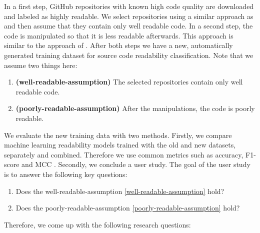 \documentclass[%
class=scrreprt,
chapterprefix=false,%
open=right,%
twoside=false,%
paper=a4,%
logofile={Logo\_zentral\_farbig\_EN.png},%
thesistype=masterproposal,%
UKenglish,%
]{se2thesis}
\begin{document}
	In a first step, GitHub repositories with known high code quality are downloaded and labeled as highly readable. We select repositories using a similar approach as \citeauthor{allamanis2016convolutional} \cite{allamanis2016convolutional} and then assume that they contain only well readable code.
	In a second step, the code is manipulated so that it is less readable afterwards. This approach is similar to the approach of \citeauthor{loriot2022styler} \cite{loriot2022styler}. After both steps we have a new, automatically generated training dataset for source code readability classification.
	Note that we assume two things here:
	\begin{enumerate}
		\item \label{well-readable-assumption} \textbf{(well-readable-assumption)} The selected repositories contain only well readable code.
		\item \label{poorly-readable-assumption} \textbf{(poorly-readable-assumption)} After the manipulations, the code is poorly readable.
	\end{enumerate}
	
	
	\label{compare-models} We evaluate the new training data with two methods. Firstly, we compare machine learning readability models trained with the old and new datasets, separately and combined. Therefore we use common metrics such as accuracy, F1-score and MCC \cite{chicco2020advantages}. 
	\label{user-study} Secondly, we conclude a user study. The goal of the user study is to answer the following key questions:
	
	
	\begin{enumerate}
		\item Does the well-readable-assumption \ref{well-readable-assumption} hold?
		\item Does the poorly-readable-assumption \ref{poorly-readable-assumption} hold?
	\end{enumerate}
	
	Therefore, we come up with the following research questions:
	
	
	
\end{document}
